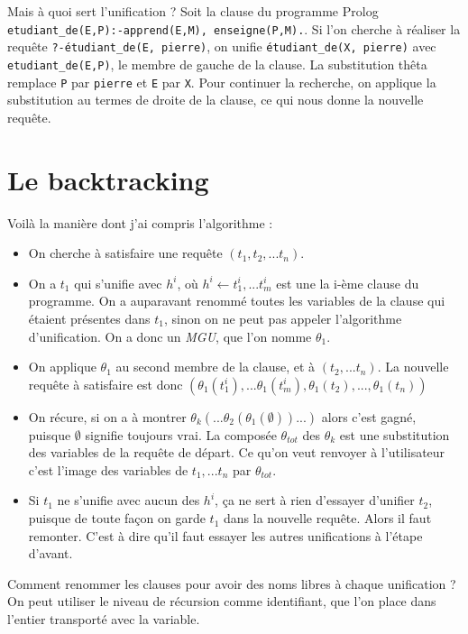 \documentclass{article}
\begin{document}
Mais à quoi sert l'unification ? Soit la clause du programme Prolog \texttt{etudiant\_de(E,P):-apprend(E,M),\ enseigne(P,M).}. Si l'on cherche à réaliser la requête \texttt{?-étudiant\_de(E,\ pierre)}, on unifie \texttt{étudiant\_de(X,\ pierre)} avec \texttt{etudiant\_de(E,P)}, le membre de gauche de la clause. La substitution thêta remplace \texttt{P} par \texttt{pierre} et \texttt{E} par \texttt{X}. Pour continuer la recherche, on applique la substitution au termes de droite de la clause, ce qui nous donne la nouvelle requête.

\section{Le backtracking}

Voilà la manière dont j'ai compris l'algorithme :
\begin{itemize}
  \item
    On cherche à satisfaire une requête \((t_1, t_2, ... t_n)\).
  \item
    On a \(t_1\) qui s'unifie avec \(h^i\), où \(h^i \leftarrow t^i_1,...t^i_m\) est une la i-ème clause du programme. On a auparavant renommé toutes les variables de la clause qui étaient présentes dans \(t_1\), sinon on ne peut pas appeler l'algorithme d'unification. On a donc un \emph{MGU}, que l'on nomme \(\theta_1\).
  \item
    On applique \(\theta_1\) au second membre de la clause, et à \((t_2, ... t_n)\). La nouvelle requête à satisfaire est donc \((\theta_1(t^i_1), ... \theta_1(t^i_m), \theta_1(t_2), ..., \theta_1(t_n))\)
  \item
    On récure, si on a à montrer \(\theta_k( ... \theta_2(\theta_1(\emptyset)) ...)\) alors c'est gagné, puisque \(\emptyset\) signifie toujours vrai. La composée \(\theta_{tot}\) des \(\theta_k\) est une substitution des variables de la requête de départ. Ce qu'on veut renvoyer à l'utilisateur c'est l'image des variables de \(t_1, ... t_n\) par \(\theta_{tot}\).
  \item
    Si \(t_1\) ne s'unifie avec aucun des \(h^i\), ça ne sert à rien d'essayer d'unifier \(t_2\), puisque de toute façon on garde \(t_1\) dans la nouvelle requête. Alors il faut remonter. C'est à dire qu'il faut essayer les autres unifications à l'étape d'avant.
\end{itemize}

Comment renommer les clauses pour avoir des noms libres à chaque unification ? On peut utiliser le niveau de récursion comme identifiant, que l'on place dans l'entier transporté avec la variable.
\end{document}
